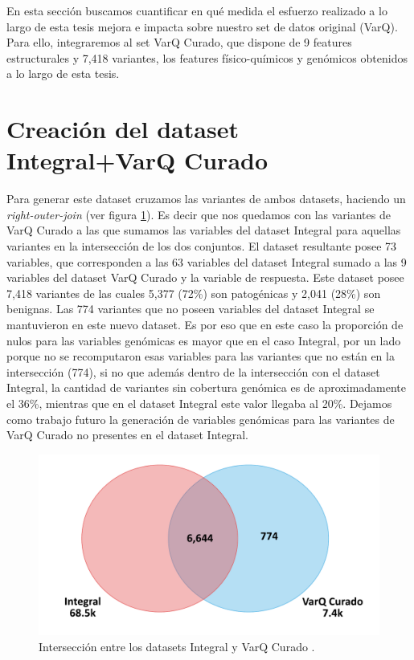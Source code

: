 
En esta sección buscamos cuantificar en qué medida el esfuerzo realizado a lo largo de esta tesis mejora e impacta sobre nuestro set de datos original (VarQ). Para ello, integraremos al set VarQ Curado, que dispone de 9 features estructurales y 7,418 variantes, los features físico-químicos y genómicos obtenidos a lo largo de esta tesis.

\section{Creación del dataset Integral+VarQ Curado}
Para generar este dataset cruzamos las variantes de ambos datasets, haciendo un \textit{right-outer-join} (ver figura \ref{fig:interseccion_varq_integral}). Es decir que nos quedamos con las variantes de VarQ Curado a las que sumamos las variables del dataset Integral para aquellas variantes en la intersección de los dos conjuntos. El dataset resultante posee 73 variables, que corresponden a las 63 variables del dataset Integral sumado a las 9 variables del dataset VarQ Curado y la variable de respuesta. Este dataset posee 7,418 variantes de las cuales 5,377 (72\%) son patogénicas y 2,041 (28\%) son benignas. Las 774 variantes que no poseen variables del dataset Integral se mantuvieron en este nuevo dataset. Es por eso que en este caso la proporción de nulos para las variables genómicas es mayor que en el caso Integral, por un lado porque no se recomputaron esas variables para las variantes que no están en la intersección (774), si no que además dentro de la intersección con el dataset Integral, la cantidad de variantes sin cobertura genómica es de aproximadamente el 36\%, mientras que en el dataset Integral este valor llegaba al 20\%. Dejamos como trabajo futuro la generación de variables genómicas para las variantes de VarQ Curado no presentes en el dataset Integral.

\begin{figure}[H]
    \centering
    \includegraphics[scale=0.4]{documents/latex/figures/3/integral_varq/interseccion_varq_integral.pdf}
    \caption{Intersección entre los datasets Integral y VarQ Curado .}
    \label{fig:interseccion_varq_integral}
\end{figure}

